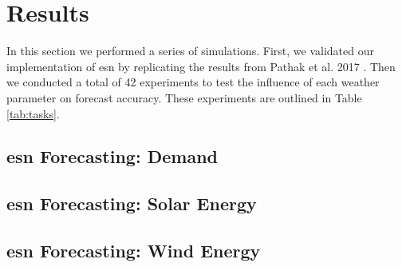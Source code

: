 \section{Results}
In this section we performed a series of simulations. First, we validated
our implementation of \gls{esn} by replicating the results from Pathak et al.
2017 \cite{pathak_using_2017}. Then we conducted a total of 42 experiments to
test the influence of each weather parameter on forecast accuracy. These experiments are outlined in Table \ref{tab:tasks}.

\subsection{\gls{esn} Forecasting: Demand}


\subsection{\gls{esn} Forecasting: Solar Energy}


\subsection{\gls{esn} Forecasting: Wind Energy}


